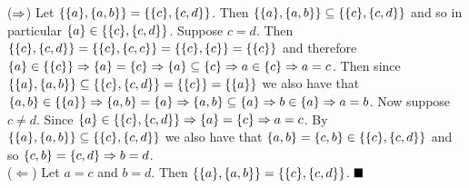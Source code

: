 \documentclass[11pt]{book}
\begin{document}
\begin{enumerate}
{($\then$) Let $\set{\set{a},\set{a,b}} = \set{\set{c},\set{c,d}}$. Then $\set{\set{a},\set{a,b}} \subseteq \set{\set{c},\set{c,d}}$ and so in particular $\set{a} \in \set{\set{c},\set{c,d}}$. Suppose $c = d$. Then $\set{\set{c},\set{c,d}} = \set{\set{c},\set{c,c}} = \set{\set{c},\set{c}} = \set{\set{c}}$ and therefore $\set{a} \in \set{\set{c}} \then \set{a} = \set{c} \then \set{a} \subseteq \set{c} \then a \in \set{c} \then a = c$. Then since $\set{\set{a},\set{a,b}} \subseteq \set{\set{c},\set{c,d}} = \set{\set{c}} = \set{\set{a}}$ we also have that $\set{a,b} \in \set{\set{a}} \then \set{a,b} = \set{a} \then \set{a,b} \subseteq \set{a} \then b \in \set{a} \then a = b$. Now suppose $c \neq d$. Since $\set{a} \in \set{\set{c},\set{c,d}} \then \set{a} = \set{c} \then a = c$. By $\set{\set{a},\set{a,b}} \subseteq \set{\set{c},\set{c,d}}$ we also have that $\set{a,b} = \set{c,b} \in \set{\set{c},\set{c,d}}$ and so $\set{c,b} = \set{c,d} \then b = d$.\\ ($\Leftarrow$) Let $a = c$ and $b = d$. Then $\set{\set{a},\set{a,b}} = \set{\set{c},\set{c,d}}$. $\qed$}
\end{enumerate}

\hrulefill
\end{document}
